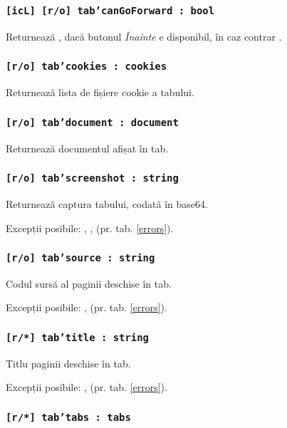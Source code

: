 \subsubsection{\texttt{[icL] [r/o] tab'canGoForward : bool}}

Returnează \true, dacă butonul \textit{Înainte} e disponibil, în caz contrar \false.

\subsubsection{\texttt{[r/o] tab'cookies : cookies}}

Returnează lista de fișiere cookie a tabului.

\subsubsection{\texttt{[r/o] tab'document : document}}

Returnează documentul afișat în tab.

\subsubsection{\texttt{[r/o] tab'screenshot : string}}

Returnează captura tabului, codată în base64.

Excepții posibile: , ,  (pr. tab. \ref{errors}).

\subsubsection{\texttt{[r/o] tab'source : string}}

Codul sursă al paginii deschise în tab.

Excepții posibile: ,  (pr. tab. \ref{errors}).

\subsubsection{\texttt{[r/*] tab'title : string}}

Titlu paginii deschise în tab.

Excepții posibile: ,  (pr. tab. \ref{errors}).

\subsubsection{\texttt{[r/*] tab'tabs : tabs}}

